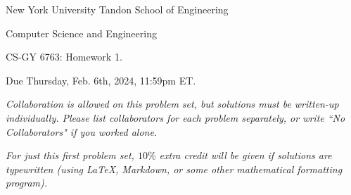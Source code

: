 \documentclass[10pt]{article}
\begin{document}
	
\begin{center}
	\normalsize
	New York University Tandon School of Engineering
	
	Computer Science and Engineering
	\medskip
	
	\large
	CS-GY 6763: Homework 1. 
	
	Due Thursday, Feb. 6th, 2024, 11:59pm ET.
	\medskip
	
	\normalsize 
	\noindent \emph{Collaboration is allowed on this problem set, but solutions must be written-up individually. Please list collaborators for each problem separately, or write ``No Collaborators" if you worked alone.}
	\medskip
	
	\noindent \emph{For just this first problem set, $10\%$ extra credit will be given if solutions are typewritten (using LaTeX, Markdown, or some other mathematical formatting program).}

\end{center} 
\end{document}

